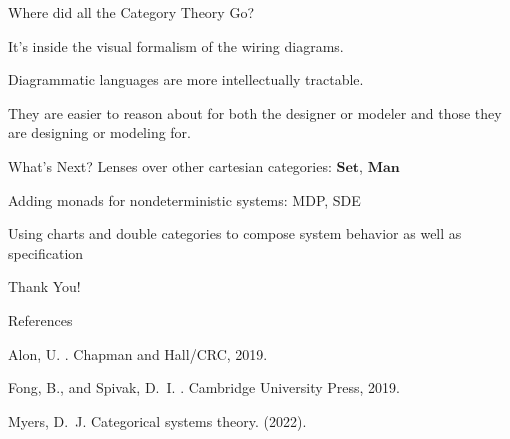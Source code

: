 \documentclass{beamer}
\begin{document}
\begin{frame}{Where did all the Category Theory Go?}

    It's inside the visual formalism of the wiring diagrams.

    \vspace*{0.5in}
    Diagrammatic languages are more intellectually tractable.

    \vspace*{0.5in}
    They are easier to reason about for both the designer or modeler and those they are designing or modeling for.

\end{frame}


\begin{frame}{What's Next?}
    Lenses over other cartesian categories: $\textbf{Set}$, $\textbf{Man}$

    \vspace*{0.5in}
    Adding monads for nondeterministic systems: MDP, SDE

    \vspace*{0.5in}
    Using charts and double categories to compose system behavior as well as specification
\end{frame}




\begin{frame}{}
    \begin{center}
        \begin{Huge}
            Thank You!
        \end{Huge}
    \end{center}
\end{frame}


\begin{frame}{References}
    \begin{thebibliography}{10}

        {\sc Alon, U.}
        .
        \newblock Chapman and Hall/CRC, 2019.

        {\sc Fong, B., and Spivak, D.~I.}
        .
        \newblock Cambridge University Press, 2019.

        {\sc Myers, D.~J.}
        \newblock Categorical systems theory.
         (2022).
    \end{thebibliography}
\end{frame}
\end{document}
